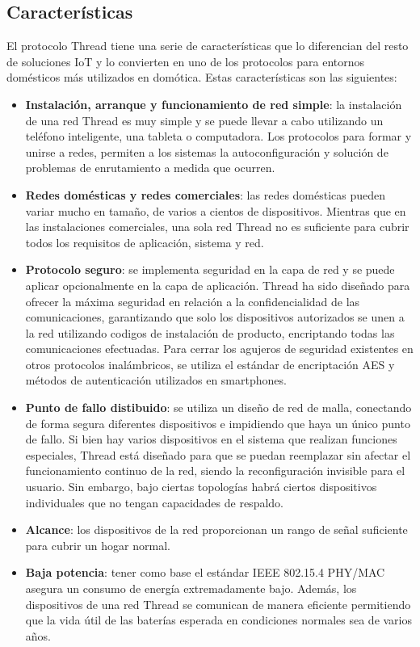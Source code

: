 \subsection{Características} %
El protocolo Thread tiene una serie de características que lo diferencian del resto de soluciones IoT y lo convierten en uno de los protocolos para entornos domésticos más utilizados en domótica. Estas características son las siguientes:
\begin{itemize}
\item {\bf Instalación, arranque y funcionamiento de red simple}: la instalación de una red Thread es muy simple y se puede llevar a cabo utilizando un teléfono inteligente, una tableta o computadora. Los protocolos para formar y unirse a redes, permiten a los sistemas la autoconfiguración y solución de problemas de enrutamiento a medida que ocurren.
\item {\bf Redes domésticas y redes comerciales}: las redes domésticas pueden variar mucho en tamaño, de varios a cientos de dispositivos. Mientras que en las instalaciones comerciales, una sola red Thread no es suficiente para cubrir todos los requisitos de aplicación, sistema y red.
\item {\bf Protocolo seguro}: se implementa seguridad en la capa de red y se puede aplicar opcionalmente en la capa de aplicación. Thread ha sido diseñado para ofrecer la máxima seguridad en relación a la confidencialidad de las comunicaciones, garantizando que solo los dispositivos autorizados se unen a la red utilizando codigos de instalación de producto, encriptando todas las comunicaciones efectuadas. Para cerrar los agujeros de seguridad existentes en otros protocolos inalámbricos, se utiliza el estándar de encriptación AES y métodos de autenticación utilizados en smartphones.
\item {\bf Punto de fallo distibuido}: se utiliza un diseño de red de malla, conectando de forma segura diferentes dispositivos e impidiendo que haya un único punto de fallo. Si bien hay varios dispositivos en el sistema que realizan funciones especiales, Thread está diseñado para que se puedan reemplazar sin afectar el funcionamiento continuo de la red, siendo la reconfiguración invisible para el usuario. Sin embargo, bajo ciertas topologías habrá ciertos dispositivos individuales que no tengan capacidades de respaldo.
\item {\bf Alcance}: los dispositivos de la red proporcionan un rango de señal suficiente para cubrir un hogar normal.
\item {\bf Baja potencia}: tener como base el estándar IEEE 802.15.4 PHY/MAC asegura un consumo de energía extremadamente bajo. Además, los dispositivos de una red Thread se comunican de manera eficiente permitiendo que la vida útil de las baterías esperada en condiciones normales sea de varios años.
\end{itemize}
\clearpage




